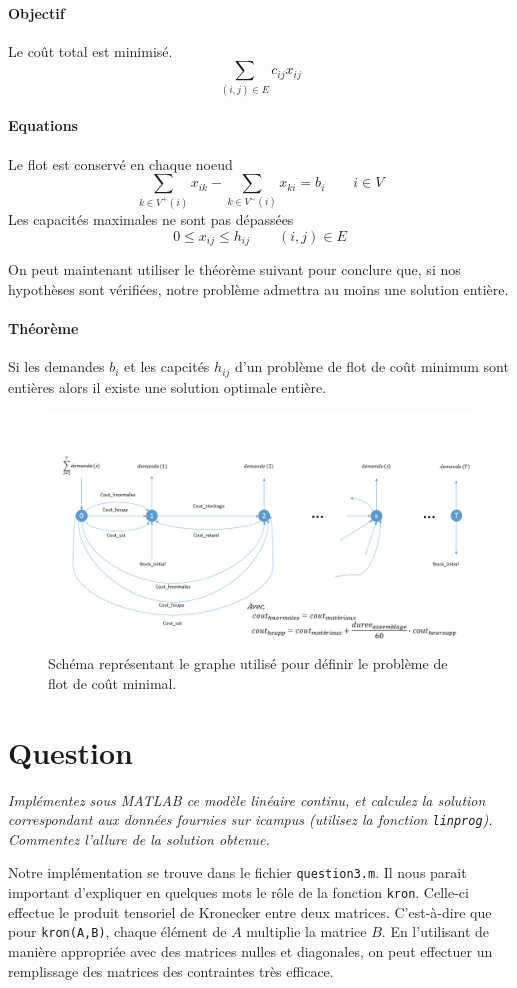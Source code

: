 \documentclass[12pt,oneside,a4paper]{article}
\newcommand{\question}
{
\addtocounter{section}{1}
\section*{Question \thesection}
}
\begin{document}
\paragraph{Objectif}
Le coût total est minimisé.
\[ \sum_{(i, j) \in E} c_{ij} x_{ij} \]
\paragraph{Equations} Le flot est conservé en chaque noeud
\[ \sum_{k \in V^{+}(i)} x_{ik} - \sum_{k \in V^{-}(i)} x_{ki} 
  = b_i \qquad i \in V
\]
Les capacités maximales ne sont pas dépassées
\[ 0 \leq x_{ij} \leq h_{ij} \qquad (i, j) \in E \]

On peut maintenant utiliser le théorème suivant pour conclure que, si nos hypothèses sont vérifiées, notre problème admettra au moins une solution entière.
\paragraph{Théorème}
Si les demandes $b_i$ et les capcités $h_{ij}$ d'un problème de flot de coût minimum sont entières alors il existe une solution optimale entière.

\begin{figure}[H]
	\centering
		\includegraphics[scale = 0.5]{img/Schema_flot.png}
	\caption{Schéma représentant le graphe utilisé pour définir 
  le problème de flot de coût minimal.}
	\label{fig:schemaFlot}
\end{figure}

\question %
\emph{Implémentez sous MATLAB ce modèle linéaire continu, 
et calculez la solution correspondant aux données fournies sur icampus 
(utilisez la fonction \texttt{linprog}). 
Commentez l'allure de la solution obtenue.}

Notre implémentation se trouve dans le fichier \texttt{question3.m}.
Il nous parait important d'expliquer en quelques mots le r\^ole
de la fonction \texttt{kron}.
Celle-ci effectue le produit tensoriel de Kronecker entre deux matrices.
C'est-à-dire que pour \texttt{kron(A,B)},
chaque élément de $A$ multiplie la matrice $B$.
En l'utilisant de manière appropriée avec des matrices nulles et diagonales,
on peut effectuer un remplissage des matrices des contraintes très efficace. 
\end{document}
